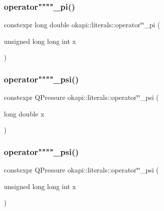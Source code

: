 \mbox{\label{namespaceokapi_1_1literals_a32a563b32efa7e39480f90e5b9db8e6a}} 
\subsubsection{\texorpdfstring{operator""""\_pi()}{operator""\_pi()}\hspace{0.1cm}{\footnotesize\ttfamily [2/2]}}
{\footnotesize\ttfamily constexpr long double okapi\+::literals\+::operator\char`\"{}\char`\"{}\+\_\+pi (\begin{DoxyParamCaption}\item[{unsigned long long int}]{x }\end{DoxyParamCaption})}

\mbox{\label{namespaceokapi_1_1literals_a1f9c5bdd623f5eaf85c0976284c19ff5}} 
\subsubsection{\texorpdfstring{operator""""\_psi()}{operator""\_psi()}\hspace{0.1cm}{\footnotesize\ttfamily [1/2]}}
{\footnotesize\ttfamily constexpr Q\+Pressure okapi\+::literals\+::operator\char`\"{}\char`\"{}\+\_\+psi (\begin{DoxyParamCaption}\item[{long double}]{x }\end{DoxyParamCaption})}

\mbox{\label{namespaceokapi_1_1literals_a417c6915b7fda121bfd22db3bb721b18}} 
\subsubsection{\texorpdfstring{operator""""\_psi()}{operator""\_psi()}\hspace{0.1cm}{\footnotesize\ttfamily [2/2]}}
{\footnotesize\ttfamily constexpr Q\+Pressure okapi\+::literals\+::operator\char`\"{}\char`\"{}\+\_\+psi (\begin{DoxyParamCaption}\item[{unsigned long long int}]{x }\end{DoxyParamCaption})}

